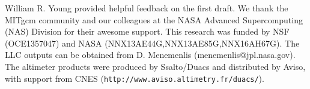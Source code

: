 \documentclass[grl]{agutex2015}
\begin{document}
\begin{article}
%
%




%

\begin{acknowledgments}
 William R. Young provided helpful feedback on the first draft. We thank the MITgcm community and our colleagues at the NASA Advanced
Supercomputing (NAS) Division for their awesome support.
This research was funded by NSF (OCE1357047) and NASA (NNX13AE44G,NNX13AE85G,NNX16AH67G).
The LLC outputs can be obtained from D. Menemenlis (menemenlis@jpl.nasa.gov). The altimeter products were produced by Ssalto/Duacs
and distributed by Aviso, with support from CNES (\texttt{http://www.aviso.altimetry.fr/duacs/}).
\end{acknowledgments}


\end{article}
\end{document}
